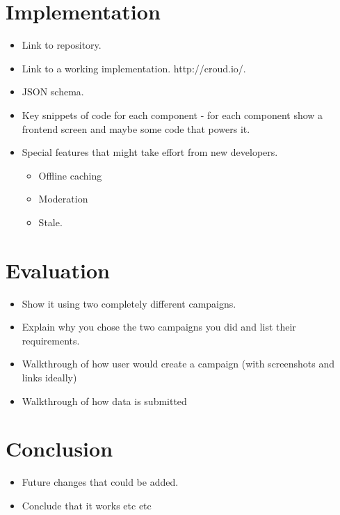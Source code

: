 \documentclass{article}
\let\oldsection\section
\renewcommand\section{\clearpage\oldsection}
\begin{document}
	\section{Implementation}
	\label{sec:implementation}
		\begin{itemize}
			\item Link to repository.
			\item Link to a working implementation. http://croud.io/.
			\item JSON schema.
			\item Key snippets of code for each component - for each component show a frontend screen and maybe some code that powers it.
			\item Special features that might take effort from new developers.
			\begin{itemize}
				\item Offline caching
				\item Moderation
				\item Stale.
			\end{itemize}
		\end{itemize}

	\section{Evaluation}
	\label{sec:evaluation}
		\begin{itemize}
			\item Show it using two completely different campaigns.
			\item Explain why you chose the two campaigns you did and list their requirements.
			\item Walkthrough of how user would create a campaign (with screenshots and links ideally)
			\item Walkthrough of how data is submitted
		\end{itemize}
	\section{Conclusion}
	\label{sec:conclusion}
		\begin{itemize}
			\item Future changes that could be added.
			\item Conclude that it works etc etc
		\end{itemize}

	
	
\end{document}
